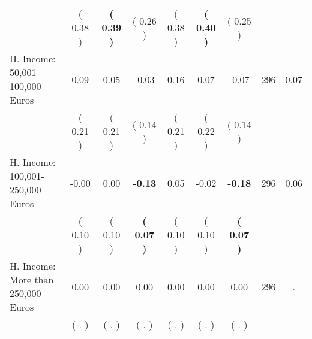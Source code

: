 \begin{tabular}{lcccccccc}
 & (     0.38 ) & \textbf{(     0.39 )} & (     0.26 ) & (     0.38 ) & \textbf{(     0.40 )} & (     0.25 ) & \\
H. Income: 50,001-100,000 Euros &      0.09 &      0.05 &     -0.03 &      0.16 &      0.07 &     -0.07 & 296 &       0.07 \\ 
 & (     0.21 ) & (     0.21 ) & (     0.14 ) & (     0.21 ) & (     0.22 ) & (     0.14 ) & \\
H. Income: 100,001-250,000 Euros &     -0.00 &      0.00 & \textbf{    -0.13} &      0.05 &     -0.02 & \textbf{    -0.18} & 296 &       0.06 \\ 
 & (     0.10 ) & (     0.10 ) & \textbf{(     0.07 )} & (     0.10 ) & (     0.10 ) & \textbf{(     0.07 )} & \\
H. Income: More than 250,000 Euros &      0.00 &      0.00 &      0.00 &      0.00 &      0.00 &      0.00 & 296 &          . \\ 
 & (        . ) & (        . ) & (        . ) & (        . ) & (        . ) & (        . ) & \\
\bottomrule
\end{tabular}

